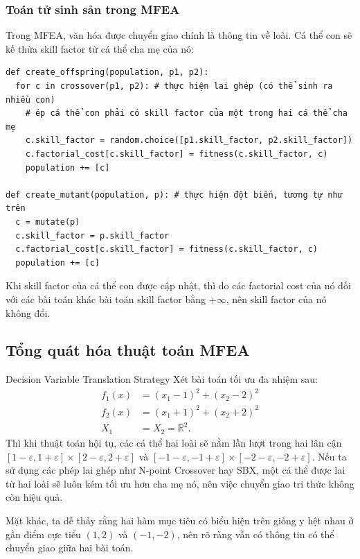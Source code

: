 \begin{frame}[fragile]
\frametitle{Toán tử sinh sản trong MFEA}
Trong MFEA, văn hóa được chuyển giao chính là thông tin về loài. Cá thể con sẽ
kế thừa skill factor từ cá thể cha mẹ của nó:
\begin{verbatim}
def create_offspring(population, p1, p2):
  for c in crossover(p1, p2): # thực hiện lai ghép (có thể sinh ra nhiều con)
    # ép cá thể con phải có skill factor của một trong hai cá thể cha mẹ
    c.skill_factor = random.choice([p1.skill_factor, p2.skill_factor])
    c.factorial_cost[c.skill_factor] = fitness(c.skill_factor, c)
    population += [c]

def create_mutant(population, p): # thực hiện đột biến, tương tự như trên
  c = mutate(p)
  c.skill_factor = p.skill_factor
  c.factorial_cost[c.skill_factor] = fitness(c.skill_factor, c)
  population += [c]
\end{verbatim}

Khi skill factor của cá thể con được cập nhật, thì do các factorial cost của nó
đối với các bài toán khác bài toán skill factor bằng \( +\infty \), nên skill
factor của nó không đổi.
\end{frame}


\subsection{Tổng quát hóa thuật toán MFEA} %
\label{sub:Tổng quát hóa thuật toán MFEA}

\begin{frame}{Decision Variable Translation Strategy}
  Xét bài toán tối ưu đa nhiệm sau:
  \begin{align*}
    f_{1}(x) &= (x_{1}-1)^2+(x_{2}-2)^2 \\
    f_{2}(x) &=  (x_{1}+1)^2+(x_{2}+2)^2 \\
    X_{1} &= X_{2} = \mathbb{R}^2
  .\end{align*}
  Thì khi thuật toán hội tụ, các cá thể hai loài sẽ nằm lần lượt trong hai lân cận \(
  [1-\varepsilon,1+\varepsilon] \times [2-\varepsilon, 2+\varepsilon] \) và \(
  [-1-\varepsilon, -1+\varepsilon] \times [-2-\varepsilon, -2+\varepsilon] \).
  Nếu ta sử dụng các phép lai ghép như N-point Crossover hay SBX, một cá thể
  được lai từ hai loài sẽ luôn kém tối ưu hơn cha mẹ nó, nên việc chuyển giao
  tri thức không còn hiệu quả.

  Mặt khác, ta dễ thấy rằng hai hàm mục tiêu có biểu hiện trên giống y hệt nhau
  ở gần điểm cực tiểu \( (1, 2) \) và \( (-1, -2) \), nên rõ ràng vẫn có thông
  tin có thể chuyển giao giữa hai bài toán.
\end{frame}

